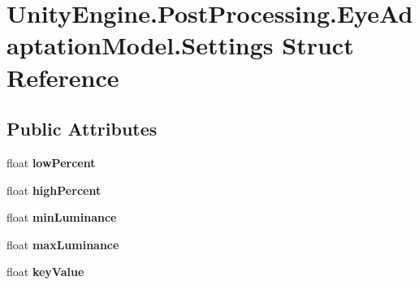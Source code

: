 \hypertarget{struct_unity_engine_1_1_post_processing_1_1_eye_adaptation_model_1_1_settings}{}\section{Unity\+Engine.\+Post\+Processing.\+Eye\+Adaptation\+Model.\+Settings Struct Reference}
\label{struct_unity_engine_1_1_post_processing_1_1_eye_adaptation_model_1_1_settings}
\subsection*{Public Attributes}
\begin{DoxyCompactItemize}
\item 
\mbox{\label{struct_unity_engine_1_1_post_processing_1_1_eye_adaptation_model_1_1_settings_a5c5b3f78ea3dbd8f92838bfce4b55ddb}} 
float {\bfseries low\+Percent}
\item 
\mbox{\label{struct_unity_engine_1_1_post_processing_1_1_eye_adaptation_model_1_1_settings_a8d8a8ead5347bf7fc71694e16e07426f}} 
float {\bfseries high\+Percent}
\item 
\mbox{\label{struct_unity_engine_1_1_post_processing_1_1_eye_adaptation_model_1_1_settings_ae879c206fd2942ff813f2a2eb3919943}} 
float {\bfseries min\+Luminance}
\item 
\mbox{\label{struct_unity_engine_1_1_post_processing_1_1_eye_adaptation_model_1_1_settings_a66a092db35ea701685512dde96353ad0}} 
float {\bfseries max\+Luminance}
\item 
\mbox{\label{struct_unity_engine_1_1_post_processing_1_1_eye_adaptation_model_1_1_settings_a839a21d11c4bdc81b2895307f3aafbc0}} 
float {\bfseries key\+Value}
\item 
\mbox{\label{struct_unity_engine_1_1_post_processing_1_1_eye_adaptation_model_1_1_settings_aecc9d7b4230c0c1ceb8754771559c44d}} 

\end{DoxyCompactItemize}
